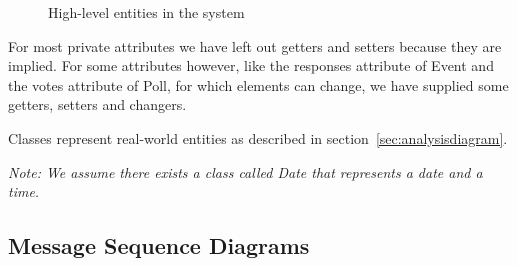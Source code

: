 \begin{figure}[H]
		\caption{High-level entities in the system}
		\label{fig:class-diagram}
	\end{figure}

	For most private attributes we have left out getters and setters because they are implied. For some attributes however, like the responses attribute of Event and the votes attribute of Poll, for which elements can change, we have supplied some getters, setters and changers.

	Classes represent real-world entities as described in section~\ref{sec:analysisdiagram}.

	\emph{Note: We assume there exists a class called \textnormal{Date} that represents a date and a time.}

\subsection{Message Sequence Diagrams}

